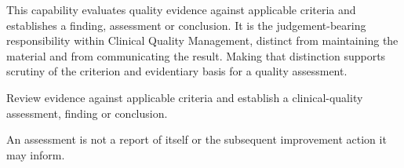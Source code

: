 This capability evaluates quality evidence against applicable criteria and establishes a finding, assessment or conclusion. It is the judgement-bearing responsibility within Clinical Quality Management, distinct from maintaining the material and from communicating the result. Making that distinction supports scrutiny of the criterion and evidentiary basis for a quality assessment.



Review evidence against applicable criteria and establish a clinical-quality assessment, finding or conclusion.



An assessment is not a report of itself or the subsequent improvement action it may inform.


